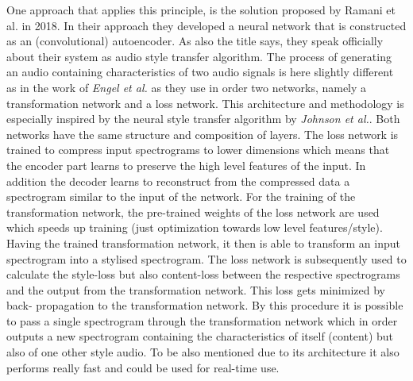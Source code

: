 One approach that applies this principle, is the solution proposed by Ramani et al. in 2018. \cite{Ramani2018} In their approach they developed a neural network that is constructed as an (convolutional) autoencoder. As also the title says, they speak officially about their system as audio style transfer algorithm. The process of generating an audio containing characteristics of two audio signals is here slightly different as in the work of \textit{Engel et al.} as they use in order two networks, namely a transformation network and a loss network. This architecture and methodology is especially inspired by the neural style transfer algorithm by \textit{Johnson et al.}. Both networks have the same structure and composition of layers. The loss network is trained to compress input spectrograms to lower dimensions which means that the encoder part learns to preserve the high level features of the input. In addition the decoder learns to reconstruct from the compressed data a spectrogram similar to the input of the network. For the training of the transformation network, the pre-trained weights of the loss network are used which speeds up training (just optimization towards low level features/style). Having the trained transformation network, it then is able to transform an input spectrogram into a stylised spectrogram. The loss network is subsequently used to calculate the style-loss but also content-loss between the respective spectrograms and the output from the transformation network. This loss gets minimized by back- propagation to the transformation network. By this procedure it is possible to pass a single spectrogram through the transformation network which in order outputs a new spectrogram containing the characteristics of itself (content) but also of one other style audio. To be also mentioned due to its architecture it also performs really fast and could be used for real-time use.\\

